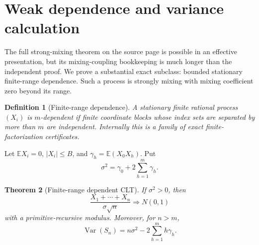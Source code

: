 \documentclass[11pt]{article}
\newtheorem{theorem}{Theorem}[section]
\newtheorem{definition}[theorem]{Definition}
\newcommand{\E}{\mathbb E}
\newcommand{\Var}{\operatorname{Var}}
\begin{document}
\section{Weak dependence and variance calculation}
\label{sec:dependence}

The full strong-mixing theorem on the source page is possible in an effective
presentation, but its mixing-coupling bookkeeping is much longer than the
independent proof.  We prove a substantial exact subclass: bounded stationary
finite-range dependence.  Such a process is strongly mixing with mixing
coefficient zero beyond its range.

\begin{definition}[Finite-range dependence]
A stationary finite rational process \((X_i)\) is \(m\)-dependent if finite
coordinate blocks whose index sets are separated by more than \(m\) are
independent.  Internally this is a family of exact finite-factorization
certificates.
\end{definition}

Let \(\E X_i=0\), \(|X_i|\le B\), and
\(\gamma_h=\E(X_0X_h)\).  Put
\[
 \sigma^2=\gamma_0+2\sum_{h=1}^{m}\gamma_h.           \tag{14.1}
\]

\begin{theorem}[Finite-range dependent CLT]\label{thm:m-dependent}
If \(\sigma^2>0\), then
\[
 \frac{X_1+\cdots+X_n}{\sigma\sqrt n}
 \Longrightarrow N(0,1)                              \tag{14.2}
\]
with a primitive-recursive modulus.  Moreover, for \(n>m\),
\[
 \Var(S_n)=n\sigma^2-2\sum_{h=1}^{m}h\gamma_h.        \tag{14.3}
\]
\end{theorem}
\end{document}
